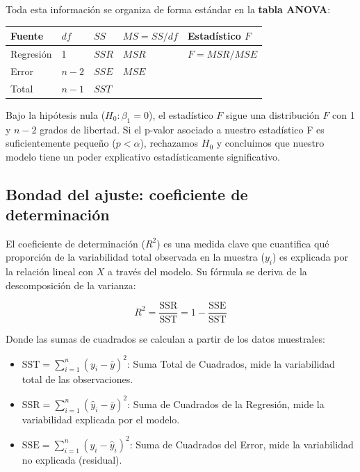 \documentclass[
  letterpaper,
  DIV=11,
  numbers=noendperiod]{scrreprt}
\providecommand{\tightlist}{%
  \setlength{\itemsep}{0pt}\setlength{\parskip}{0pt}}
\begin{document}
Toda esta información se organiza de forma estándar en la \textbf{tabla
ANOVA}:

\begin{longtable}[]{@{}lllll@{}}
\toprule\noalign{}
Fuente & \(df\) & \(SS\) & \(MS = SS/df\) & Estadístico \(F\) \\
\midrule\noalign{}
\endhead
\bottomrule\noalign{}
\endlastfoot
Regresión & 1 & \(SSR\) & \(MSR\) & \(F = MSR/MSE\) \\
Error & \(n-2\) & \(SSE\) & \(MSE\) & \\
Total & \(n-1\) & \(SST\) & & \\
\end{longtable}

Bajo la hipótesis nula (\(H_0: \beta_1 = 0\)), el estadístico \(F\)
sigue una distribución \(F\) con 1 y \(n-2\) grados de libertad. Si el
p-valor asociado a nuestro estadístico F es suficientemente pequeño
(\(p < \alpha\)), rechazamos \(H_0\) y concluimos que nuestro modelo
tiene un poder explicativo estadísticamente significativo.

\subsection{Bondad del ajuste: coeficiente de
determinación}\label{bondad-del-ajuste-coeficiente-de-determinaciuxf3n}

El coeficiente de determinación (\(R^2\)) es una medida clave que
cuantifica qué proporción de la variabilidad total observada en la
muestra (\(y_i\)) es explicada por la relación lineal con \(X\) a través
del modelo. Su fórmula se deriva de la descomposición de la varianza:

\[
R^2 = \frac{\text{SSR}}{\text{SST}} = 1 - \frac{\text{SSE}}{\text{SST}}
\]

Donde las sumas de cuadrados se calculan a partir de los datos
muestrales:

\begin{itemize}
\tightlist
\item
  \(\text{SST} = \sum_{i=1}^n (y_i - \bar{y})^2\): Suma Total de
  Cuadrados, mide la variabilidad total de las observaciones.
\item
  \(\text{SSR} = \sum_{i=1}^n (\hat{y}_i - \bar{y})^2\): Suma de
  Cuadrados de la Regresión, mide la variabilidad explicada por el
  modelo.
\item
  \(\text{SSE} = \sum_{i=1}^n (y_i - \hat{y}_i)^2\): Suma de Cuadrados
  del Error, mide la variabilidad no explicada (residual).
\end{itemize}
\end{document}
